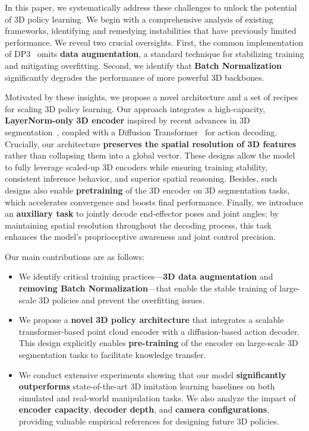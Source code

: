 \documentclass[runningheads]{llncs}
\begin{document}
In this paper, we systematically address these challenges to unlock the potential of 3D policy learning. We begin with a comprehensive analysis of existing frameworks, identifying and remedying instabilities that have previously limited performance. We reveal two crucial oversights. First, the common implementation of DP3~\cite{ze20243d} omits \textbf{data augmentation}, a standard technique for stabilizing training and mitigating overfitting. Second, we identify that \textbf{Batch Normalization} significantly degrades the performance of more powerful 3D backbones.

Motivated by these insights, we propose a novel architecture and a set of recipes for scaling 3D policy learning. Our approach integrates a high-capacity, \textbf{LayerNorm-only 3D encoder} inspired by recent advances in 3D segmentation~\cite{zhou2024point}, coupled with a Diffusion Transformer~\cite{peebles2023scalable} for action decoding. Crucially, our architecture \textbf{preserves the spatial resolution of 3D features} rather than collapsing them into a global vector. These designs allow the model to fully leverage scaled-up 3D encoders while ensuring training stability, consistent inference behavior, and superior spatial reasoning. Besides, such designs also enable \textbf{pretraining} of the 3D encoder on 3D segmentation tasks, which accelerates convergence and boosts final performance. Finally, we introduce an \textbf{auxiliary task} to jointly decode end-effector poses and joint angles; by maintaining spatial resolution throughout the decoding process, this task enhances the model’s proprioceptive awareness and joint control precision.


Our main contributions are as follows:
\begin{itemize}
    \item We identify critical training practices—\textbf{3D data augmentation} and \textbf{removing Batch Normalization}—that enable the stable training of large-scale 3D policies and prevent the overfitting issues.
    \item We propose a \textbf{novel 3D policy architecture} that integrates a scalable transformer-based point cloud encoder with a diffusion-based action decoder. This design explicitly enables \textbf{pre-training} of the encoder on large-scale 3D segmentation tasks to facilitate knowledge transfer.
    \item We conduct extensive experiments showing that our model \textbf{significantly outperforms} state-of-the-art 3D imitation learning baselines on both simulated and real-world manipulation tasks. We also analyze the impact of \textbf{encoder capacity}, \textbf{decoder depth}, and \textbf{camera configurations}, providing valuable empirical references for designing future 3D policies.
\end{itemize}
\end{document}
